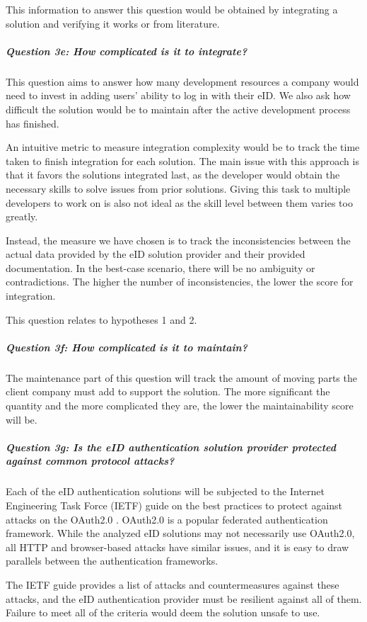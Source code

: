 This information to answer this question would be obtained by integrating a solution and verifying it works or from literature.

\subparagraph{Question 3e: How complicated is it to integrate?}\noindent

This question aims to answer how many development resources a company would need to invest in adding users' ability to log in with their eID. We also ask how difficult the solution would be to maintain after the active development process has finished.

An intuitive metric to measure integration complexity would be to track the time taken to finish integration for each solution. The main issue with this approach is that it favors the solutions integrated last, as the developer would obtain the necessary skills to solve issues from prior solutions. Giving this task to multiple developers to work on is also not ideal as the skill level between them varies too greatly.

Instead, the measure we have chosen is to track the inconsistencies between the actual data provided by the eID solution provider and their provided documentation. In the best-case scenario, there will be no ambiguity or contradictions. The higher the number of inconsistencies, the lower the score for integration.

This question relates to hypotheses 1 and 2.

\subparagraph{Question 3f: How complicated is it to maintain?}\noindent

The maintenance part of this question will track the amount of moving parts the client company must add to support the solution. The more significant the quantity and the more complicated they are, the lower the maintainability score will be.

\subparagraph{Question 3g: Is the eID authentication solution provider protected against common protocol attacks?}\noindent

Each of the eID authentication solutions will be subjected to the Internet Engineering Task Force (IETF) guide on the best practices to protect against attacks on the OAuth2.0 \cite{ietf-oauth-security-topics-19}. OAuth2.0 \cite{rfc6749} is a popular federated authentication framework. While the analyzed eID solutions may not necessarily use OAuth2.0, all HTTP and browser-based attacks have similar issues, and it is easy to draw parallels between the authentication frameworks.

The IETF guide provides a list of attacks and countermeasures against these attacks, and the eID authentication provider must be resilient against all of them. Failure to meet all of the criteria would deem the solution unsafe to use.

